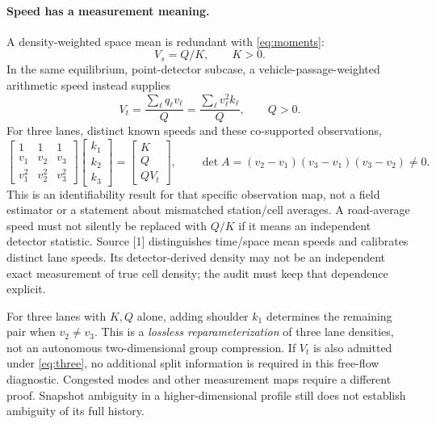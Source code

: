 \documentclass[10pt,a4paper]{article}
\begin{document}
\paragraph{Speed has a measurement meaning.}
A density-weighted space mean is redundant with \eqref{eq:moments}:
\begin{equation}
 V_s=Q/K, \qquad K>0.
\end{equation}
In the same equilibrium, point-detector subcase, a vehicle-passage-weighted
arithmetic speed instead supplies
\begin{equation}
 V_t=\frac{\sum_\ell q_\ell v_\ell}{Q}
     =\frac{\sum_\ell v_\ell^2 k_\ell}{Q},\qquad Q>0.
\end{equation}
For three lanes, distinct known speeds and these co-supported observations,
\begin{equation}
 \begin{bmatrix}1&1&1\\v_1&v_2&v_3\\v_1^2&v_2^2&v_3^2\end{bmatrix}
 \begin{bmatrix}k_1\\k_2\\k_3\end{bmatrix}
 =\begin{bmatrix}K\\Q\\QV_t\end{bmatrix},\qquad
 \det A=(v_2-v_1)(v_3-v_1)(v_3-v_2)\ne0.
 \label{eq:three}
\end{equation}
This is an identifiability result for that specific observation map, not a
field estimator or a statement about mismatched station/cell averages.
A road-average speed must not silently be replaced with $Q/K$ if it means
an independent detector statistic. Source [1] distinguishes time/space mean
speeds and calibrates distinct lane speeds. Its detector-derived density may
not be an independent exact measurement of true cell density; the audit must
keep that dependence explicit.

For three lanes with $K,Q$ alone, adding shoulder $k_1$ determines the remaining
pair when $v_2\ne v_3$. This is a \emph{lossless reparameterization} of three
lane densities, not an autonomous two-dimensional group compression.
If $V_t$ is also admitted under \eqref{eq:three}, no additional split information
is required in this free-flow diagnostic. Congested modes and other measurement
maps require a different proof. Snapshot ambiguity in a higher-dimensional
profile still does not establish ambiguity of its full history.
\end{document}

